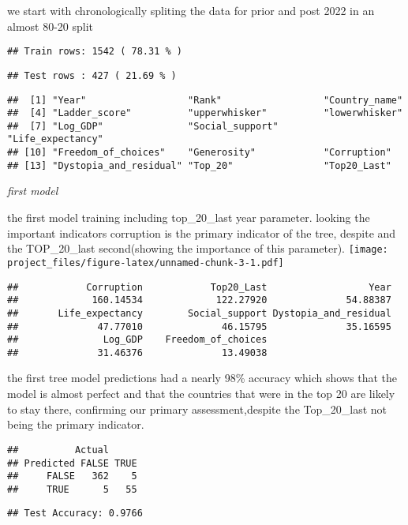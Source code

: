 \documentclass[
]{article}
\begin{document}
we start with chronologically spliting the data for prior and post 2022
in an almost 80-20 split

\begin{verbatim}
## Train rows: 1542 ( 78.31 % )
\end{verbatim}

\begin{verbatim}
## Test rows : 427 ( 21.69 % )
\end{verbatim}

\begin{verbatim}
##  [1] "Year"                  "Rank"                  "Country_name"         
##  [4] "Ladder_score"          "upperwhisker"          "lowerwhisker"         
##  [7] "Log_GDP"               "Social_support"        "Life_expectancy"      
## [10] "Freedom_of_choices"    "Generosity"            "Corruption"           
## [13] "Dystopia_and_residual" "Top_20"                "Top20_Last"
\end{verbatim}

\emph{first model}

the first model training including top\_20\_last year parameter. looking
the important indicators corruption is the primary indicator of the
tree, despite and the TOP\_20\_last second(showing the importance of
this parameter).
\texttt{[image: project\_files/figure-latex/unnamed-chunk-3-1.pdf]}

\begin{verbatim}
##            Corruption            Top20_Last                  Year 
##             160.14534             122.27920              54.88387 
##       Life_expectancy        Social_support Dystopia_and_residual 
##              47.77010              46.15795              35.16595 
##               Log_GDP    Freedom_of_choices 
##              31.46376              13.49038
\end{verbatim}

the first tree model predictions had a nearly 98\% accuracy which shows
that the model is almost perfect and that the countries that were in the
top 20 are likely to stay there, confirming our primary
assessment,despite the Top\_20\_last not being the primary indicator.

\begin{verbatim}
##          Actual
## Predicted FALSE TRUE
##     FALSE   362    5
##     TRUE      5   55
\end{verbatim}

\begin{verbatim}
## Test Accuracy: 0.9766
\end{verbatim}
\end{document}
